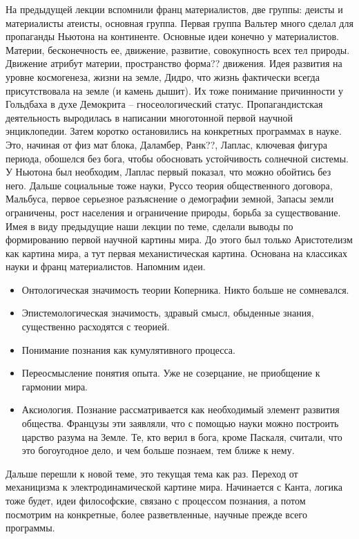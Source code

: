 \documentclass[a4paper, 12pt]{article}
\begin{document}
На предыдущей лекции вспомнили франц материалистов, две группы: деисты 
и материалисты атеисты, основная группа. Первая группа Вальтер много 
сделал для пропаганды Ньютона на континенте. Основные идеи конечно 
у материалистов. Материи, бесконечность ее, движение, развитие, 
совокупность всех тел природы. Движение атрибут материи, пространство 
форма?? движения. Идея развития на уровне космогенеза, жизни на земле, 
Дидро, что жизнь фактически всегда присутствовала на земле (и камень 
дышит). Их тоже понимание причинности у Гольдбаха в духе Демокрита -- 
гносеологический статус. Пропагандистская деятельность выродилась 
в написании многотонной первой научной энциклопедии. Затем коротко 
остановились на конкретных программах в науке. Это, начиная от физ мат 
блока, Даламбер, Ранк??, Лаплас, ключевая фигура периода, обошелся без 
бога, чтобы обосновать устойчивость солнечной системы. У Ньютона был 
необходим, Лаплас первый показал, что можно обойтись без него. Дальше 
социальные тоже науки, Руссо теория общественного договора, Мальбуса, 
первое серьезное разъяснение о демографии земной, Запасы земли 
ограничены, рост населения и ограничение природы, борьба за 
существование. Имея в виду предыдущие наши лекции по теме, сделали 
выводы по формированию первой научной картины мира. До этого был только 
Аристотелизм как картина мира, а тут первая механистическая картина. 
Основана на классиках науки и франц материалистов. Напомним идеи.
\begin{itemize}
  \item Онтологическая значимость теории Коперника. Никто больше не 
    сомневался.
  \item Эпистемологическая значимость, здравый смысл, обыденные знания, 
    существенно расходятся с теорией.
  \item Понимание познания как кумулятивного процесса.
  \item Переосмысление понятия опыта. Уже не созерцание, не приобщение 
    к гармонии мира.
  \item Аксиология. Познание рассматривается как необходимый элемент 
    развития общества. Французы эти заявляли, что с помощью науки можно 
    построить царство разума на Земле. Те, кто верил в бога, кроме 
    Паскаля, считали, что это богоугодное дело, и чем больше познаем, 
    тем ближе к нему.
\end{itemize}
Дальше перешли к новой теме, это текущая тема как раз. Переход от 
механицизма к электродинамической картине мира. Начинается с Канта, 
логика тоже будет, идеи философские, связано с процессом познания, 
а потом посмотрим на конкретные, более разветвленные, научные прежде 
всего программы.
\end{document}
